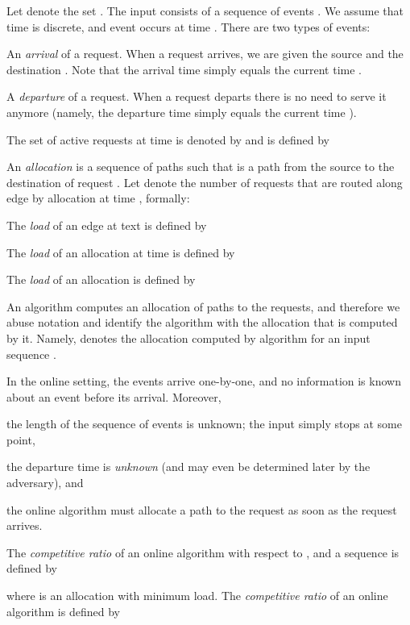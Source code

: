 \documentclass[11pt]{article}
\newenvironment{proof sketch}[1]{\noindent {\emph{Proof sketch of #1:}}}{\hfill \qed}
\begin{document}
Let  denote the set .
The input consists of a sequence of events
.  We assume that time is discrete, and
event  occurs at time .
There are two types of events:
\begin{inparaenum}[(i)]
\item An \emph{arrival} of a request. When a request  arrives, we
  are given the source  and the destination . Note that the
  arrival time  simply equals the current time .
\item A \emph{departure} of a request. When a request  departs
  there is no need to serve it anymore (namely, the departure time  simply equals the  current time ).
\end{inparaenum}

The set of active requests at time  is denoted by  and is defined by



An \emph{allocation} is a sequence  of paths such that
 is a path from the source  to the destination  of request .
Let  denote the number of requests that are routed along edge  by allocation  at time , formally:

The \emph{load} of an edge  at text  is defined by

The \emph{load} of an allocation  at time  is defined by

The \emph{load} of an allocation  is defined by


An algorithm computes an allocation of paths to the requests, and
therefore we abuse notation and identify the algorithm with the
allocation that is computed by it. Namely,  denotes the
allocation computed by algorithm  for an input sequence
.

In the online setting, the events arrive one-by-one, and no information is known about an event before its arrival.
Moreover,
\begin{inparaenum}[(1)]
  \item the length  of the sequence of events is unknown; the input simply stops at some point,
  \item the departure time  is \emph{unknown} (and may even be determined later by the adversary),  and
  \item the online algorithm must allocate a path to the request as soon as the request arrives.
\end{inparaenum}

The \emph{competitive ratio} of an online algorithm  with respect to , and a sequence  is defined
by

where  is an allocation with minimum load.
The \emph{competitive ratio} of an online algorithm  is defined by
\end{document}
